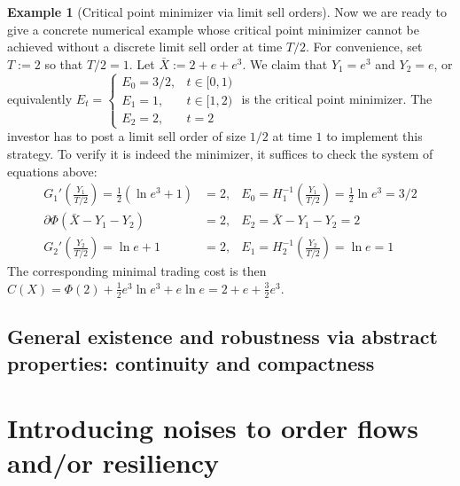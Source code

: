 \documentclass[openany,oneside]{article}
\theoremstyle{definition}
\newtheorem{eg}[thm]{Example}
\theoremstyle{remark}
\begin{document}
\begin{eg}[Critical point minimizer via limit sell orders]
Now we are ready to give a concrete numerical example whose critical point minimizer cannot be achieved without a discrete limit sell order at time $T/2$. For convenience, set $T:=2$ so that $T/2 =1$. Let $\bar{X} := 2+e+e^3$. We claim that $Y_1 = e^3$ and $Y_2 = e$, or equivalently $E_t =
\begin{cases}
E_0 = 3/2, & t\in[0,1) \\
E_1 = 1, & t\in[1,2) \\
E_2 = 2, & t=2
\end{cases}$
is the critical point minimizer. The investor has to post a limit sell order of size $1/2$ at time $1$ to implement this strategy. To verify it is indeed the minimizer, it suffices to check the system of equations above:
\begin{align*}
G_1'\left(\frac{Y_1}{T/2}\right) = \frac{1}{2}(\ln e^3 + 1) &= 2, & E_0 = H_1^{-1}\left(\frac{Y_1}{T/2}\right) = \frac{1}{2}\ln e^3 = 3/2 \\
\partial \Phi(\bar{X}-Y_1-Y_2) &= 2, & E_2 = \bar{X}-Y_1-Y_2 = 2 \\
G_2'\left(\frac{Y_2}{T/2}\right) = \ln e + 1 &= 2, & E_1 = H_2^{-1}\left(\frac{Y_2}{T/2}\right) = \ln e = 1
\end{align*}
The corresponding minimal trading cost is then $C(X) = \Phi(2) + \frac{1}{2} e^3 \ln e^3 + e \ln e = 2+e+\frac{3}{2}e^3$.
\end{eg}


\subsection{General existence and robustness via abstract properties: continuity and compactness}


\section{Introducing noises to order flows and/or resiliency}


{}

\end{document}
